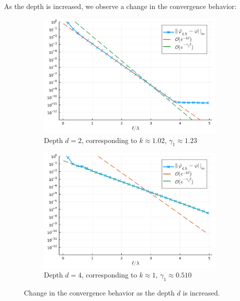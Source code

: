 \documentclass[11pt]{article}
\begin{document}
As the depth is increased, we observe a change in the convergence behavior:

\begin{figure}
  \centering
  \begin{subfigure}{0.49\linewidth}
    \includegraphics[width=\textwidth]{figures/convergence_pml_planewave_depth_2.pdf}
    \caption{Depth $d=2$, corresponding to $k \approx 1.02$, $\gamma_1 \approx 1.23$}
    \label{fig:convergence-modal-solution-depth-3}
  \end{subfigure}
  \begin{subfigure}{0.49\linewidth}
    \includegraphics[width=1\textwidth]{figures/convergence_pml_planewave_depth_4.pdf}
    \caption{Depth $d=4$, corresponding to $k \approx 1$, $\gamma_1 \approx 0.510$}
    \label{fig:convergence-modal-solution-depth-4}
  \end{subfigure}
  \label{fig:convergence-modal-solution}
  \caption{Change in the convergence behavior as the depth $d$ is increased.}
\end{figure}
\end{document}

